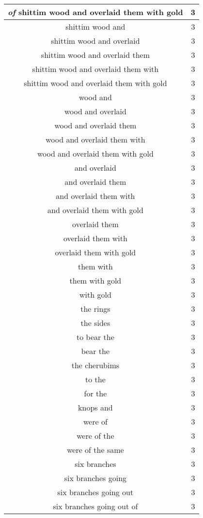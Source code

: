 \begin{center}
\begin{longtable}{|c|c|}
\emph{of} shittim wood and overlaid them with gold & 3\\ \hline 
shittim wood and & 3\\ \hline 
shittim wood and overlaid & 3\\ \hline 
shittim wood and overlaid them & 3\\ \hline 
shittim wood and overlaid them with & 3\\ \hline 
shittim wood and overlaid them with gold & 3\\ \hline 
wood and & 3\\ \hline 
wood and overlaid & 3\\ \hline 
wood and overlaid them & 3\\ \hline 
wood and overlaid them with & 3\\ \hline 
wood and overlaid them with gold & 3\\ \hline 
and overlaid & 3\\ \hline 
and overlaid them & 3\\ \hline 
and overlaid them with & 3\\ \hline 
and overlaid them with gold & 3\\ \hline 
overlaid them & 3\\ \hline 
overlaid them with & 3\\ \hline 
overlaid them with gold & 3\\ \hline 
them with & 3\\ \hline 
them with gold & 3\\ \hline 
with gold & 3\\ \hline 
the rings & 3\\ \hline 
the sides & 3\\ \hline 
to bear the & 3\\ \hline 
bear the & 3\\ \hline 
the cherubims & 3\\ \hline 
to the & 3\\ \hline 
for the & 3\\ \hline 
knops and & 3\\ \hline 
were of & 3\\ \hline 
were of the & 3\\ \hline 
were of the same & 3\\ \hline 
six branches & 3\\ \hline 
six branches going & 3\\ \hline 
six branches going out & 3\\ \hline 
six branches going out of & 3\\ \hline 

\end{longtable}
\end{center}
